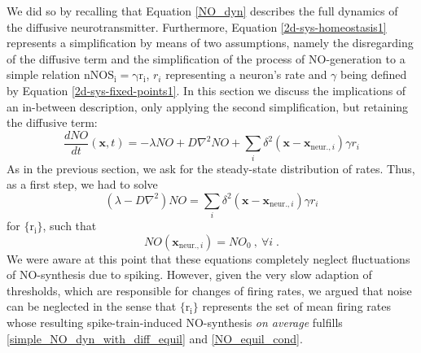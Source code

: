 \documentclass[10pt,a4paper]{article}
\begin{document}
We did so by recalling that Equation \eqref{NO_dyn} describes the full dynamics of the diffusive neurotransmitter. Furthermore, Equation \eqref{2d-sys-homeostasis1} represents a simplification by means of two assumptions, namely the disregarding of the diffusive term and the simplification of the process of NO-generation to a simple relation $\mathrm{nNOS_i = \gamma  r_i}$, $r_i$ representing a neuron's rate and $\gamma$ being defined by Equation \eqref{2d-sys-fixed-points1}. In this section we discuss the implications of an in-between description, only applying the second simplification, but retaining the diffusive term:
\begin{equation}
\frac{dNO}{dt}(\mathbf{x},t) =-\lambda NO + D \nabla^2 NO + \sum_{i} \delta^2 \left( \mathbf{x}-\mathbf{x}_{\mathrm{ neur.},i} \right) \gamma r_i
\label{simple_NO_dyn_with_diff}
\end{equation}
As in the previous section, we ask for the steady-state distribution of rates. Thus, as a first step, we had to solve
\begin{equation}
\left( \lambda - D \nabla^2 \right) NO = \sum_{i} \delta^2 \left( \mathbf{x}-\mathbf{x}_{\mathrm{ neur.},i} \right) \gamma  r_i
\label{simple_NO_dyn_with_diff_equil}
\end{equation}
for $\mathrm{\lbrace r_i\rbrace}$, such that
\begin{equation}
NO(\mathbf{x}_{\mathrm{ neur.},i}) = NO_0 \:, \: \forall i \; .
\label{NO_equil_cond}
\end{equation}
We were aware at this point that these equations completely neglect fluctuations of NO-synthesis due to spiking. However, given the very slow adaption of thresholds, which are responsible for changes of firing rates, we argued that noise can be neglected in the sense that $\mathrm{\lbrace r_i\rbrace}$ represents the set of mean firing rates whose resulting spike-train-induced NO-synthesis \emph{on average} fulfills \eqref{simple_NO_dyn_with_diff_equil} and \eqref{NO_equil_cond}.
  
\end{document}
